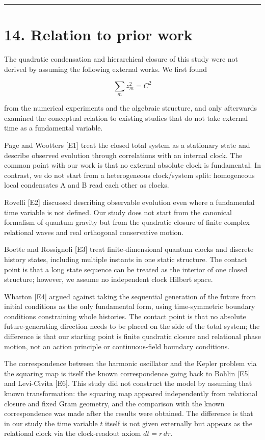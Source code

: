 \documentclass[
  a4paper,
]{article}
\begin{document}
\begin{center}\rule{0.5\linewidth}{0.5pt}\end{center}

\section{14. Relation to prior work}\label{relation-to-prior-work}

The quadratic condensation and hierarchical closure of this study were
not derived by assuming the following external works. We first found

\[
\sum_mz_m^2=C^2
\]

from the numerical experiments and the algebraic structure, and only
afterwards examined the conceptual relation to existing studies that do
not take external time as a fundamental variable.

Page and Wootters {[}E1{]} treat the closed total system as a stationary
state and describe observed evolution through correlations with an
internal clock. The common point with our work is that no external
absolute clock is fundamental. In contrast, we do not start from a
heterogeneous clock/system split: homogeneous local condensates A and B
read each other as clocks.

Rovelli {[}E2{]} discussed describing observable evolution even where a
fundamental time variable is not defined. Our study does not start from
the canonical formalism of quantum gravity but from the quadratic
closure of finite complex relational waves and real orthogonal
conservative motion.

Boette and Rossignoli {[}E3{]} treat finite-dimensional quantum clocks
and discrete history states, including multiple instants in one static
structure. The contact point is that a long state sequence can be
treated as the interior of one closed structure; however, we assume no
independent clock Hilbert space.

Wharton {[}E4{]} argued against taking the sequential generation of the
future from initial conditions as the only fundamental form, using
time-symmetric boundary conditions constraining whole histories. The
contact point is that no absolute future-generating direction needs to
be placed on the side of the total system; the difference is that our
starting point is finite quadratic closure and relational phase motion,
not an action principle or continuous-field boundary conditions.

The correspondence between the harmonic oscillator and the Kepler
problem via the squaring map is itself the known correspondence going
back to Bohlin {[}E5{]} and Levi-Civita {[}E6{]}. This study did not
construct the model by assuming that known transformation: the squaring
map appeared independently from relational closure and fixed Gram
geometry, and the comparison with the known correspondence was made
after the results were obtained. The difference is that in our study the
time variable \(t\) itself is not given externally but appears as the
relational clock via the clock-readout axiom \(dt=r\,d\tau\).
\end{document}
